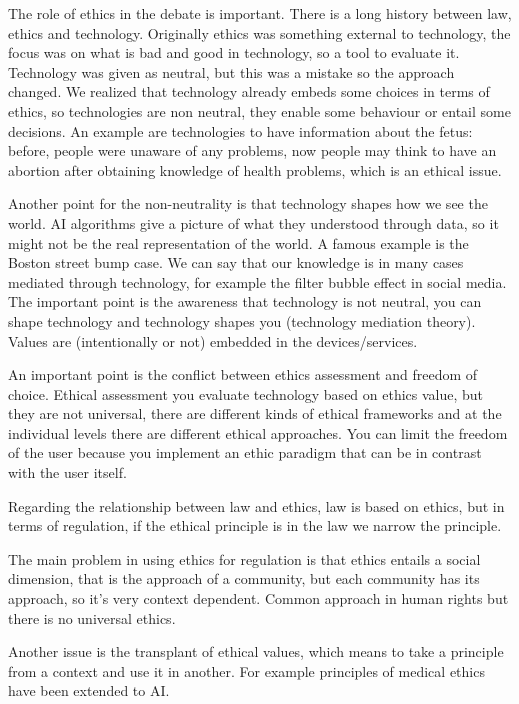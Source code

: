 The role of ethics in the debate is important. There is a long history between law, ethics and technology. Originally ethics was something external to technology, the focus was on what is bad and good in technology, so a tool to evaluate it. Technology was given as neutral, but this was a mistake so the approach changed. We realized that technology already embeds some choices in terms of ethics, so technologies are non neutral, they enable some behaviour or entail some decisions. An  example are technologies to have information about the fetus: before, people were unaware of any problems, now people may think to have an abortion after obtaining knowledge of health problems, which is an ethical issue.

Another point for the non-neutrality is that technology
shapes how we see the world. AI algorithms give a picture of what they understood through data, so it might not be the real representation of the world. A famous example is the Boston street bump case. We can say that our knowledge is in many cases mediated through technology, for example the filter bubble effect in social media. The important point is the awareness that technology is not neutral, you can shape technology and technology shapes you (technology mediation theory). Values are (intentionally or not) embedded in the devices/services. 

An important point is the conflict between ethics assessment and freedom of choice. Ethical assessment you evaluate technology based on ethics value, but they are not universal, there are different kinds of ethical frameworks and at the individual levels there are different ethical approaches. You can limit the freedom of the user because you implement an ethic paradigm that can be in contrast with the user itself.

Regarding the relationship between law and ethics, law is based on ethics, but in terms of regulation, if the ethical principle is in the law we narrow the principle. 

The main problem in using ethics for regulation is that ethics entails a social dimension, that is the approach of a community, but each community has its approach, so it's very context dependent. Common approach in human rights but there is no universal ethics.

Another issue is the transplant of ethical values, which means to take a principle from a context and use it in another. For example principles of medical ethics have been extended to AI.

